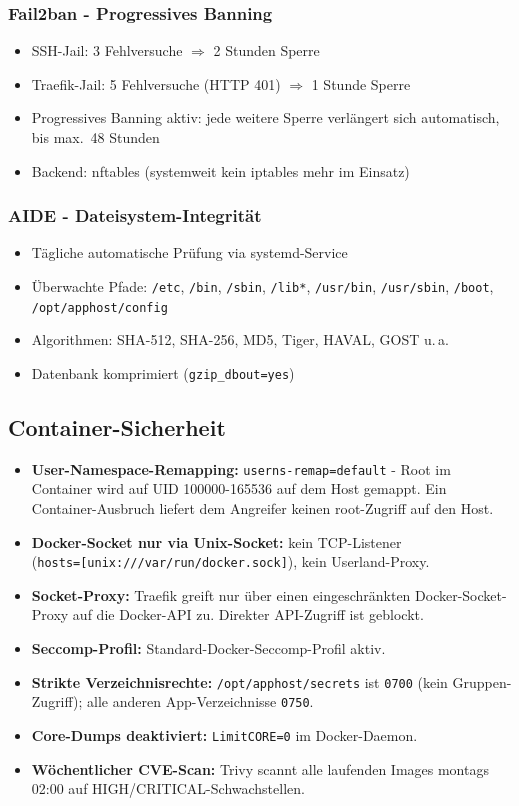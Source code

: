 \subsubsection*{Fail2ban - Progressives Banning}
\begin{itemize}
  \item SSH-Jail: 3 Fehlversuche $\Rightarrow$ 2 Stunden Sperre
  \item Traefik-Jail: 5 Fehlversuche (HTTP 401) $\Rightarrow$ 1 Stunde Sperre
  \item Progressives Banning aktiv: jede weitere Sperre verlängert sich automatisch, bis max.\ 48 Stunden
  \item Backend: nftables (systemweit kein iptables mehr im Einsatz)
\end{itemize}

\subsubsection*{AIDE - Dateisystem-Integrität}
\begin{itemize}
  \item Tägliche automatische Prüfung via systemd-Service
  \item Überwachte Pfade: \texttt{/etc}, \texttt{/bin}, \texttt{/sbin}, \texttt{/lib*}, \texttt{/usr/bin}, \texttt{/usr/sbin}, \texttt{/boot}, \texttt{/opt/apphost/config}
  \item Algorithmen: SHA-512, SHA-256, MD5, Tiger, HAVAL, GOST u.\,a.
  \item Datenbank komprimiert (\texttt{gzip\_dbout=yes})
\end{itemize}


\subsection{Container-Sicherheit}
\begin{itemize}
  \item \textbf{User-Namespace-Remapping:} \texttt{userns-remap=default} - Root im Container wird auf UID 100000-165536 auf dem Host gemappt. Ein Container-Ausbruch liefert dem Angreifer keinen root-Zugriff auf den Host.
  \item \textbf{Docker-Socket nur via Unix-Socket:} kein \ac{TCP}-Listener \\
  (\texttt{hosts=[\textquotedbl{}unix:///var/run/docker.sock\textquotedbl{}]}), kein Userland-Proxy.
  \item \textbf{Socket-Proxy:} Traefik greift nur über einen eingeschränkten Docker-Socket-Proxy auf die Docker-API zu. Direkter API-Zugriff ist geblockt.
  \item \textbf{Seccomp-Profil:} Standard-Docker-Seccomp-Profil aktiv.
  \item \textbf{Strikte Verzeichnisrechte:} \texttt{/opt/apphost/secrets} ist \texttt{0700} (kein Gruppen-Zugriff); alle anderen App-Verzeichnisse \texttt{0750}.
  \item \textbf{Core-Dumps deaktiviert:} \texttt{LimitCORE=0} im Docker-Daemon.
  \item \textbf{Wöchentlicher CVE-Scan:} Trivy scannt alle laufenden Images montags 02:00 auf HIGH/CRITICAL-Schwachstellen.
\end{itemize}

